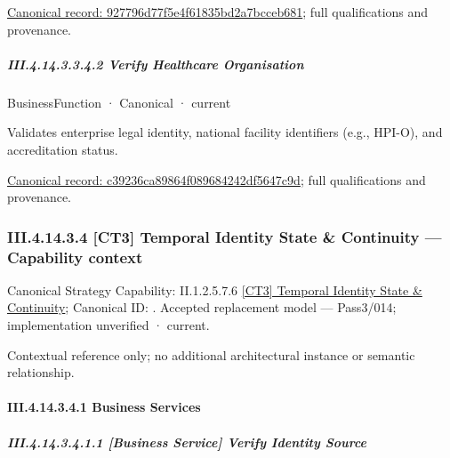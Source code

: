 {\footnotesize \href{../../../../continuum/business/business-function/927796d77f5e4f61835bd2a7bcceb681.md}{Canonical record: 927796d77f5e4f61835bd2a7bcceb681}; full qualifications and provenance.}\par
\subparagraph*{III.4.14.3.3.4.2 Verify Healthcare Organisation}
\label{navigation:III.4.14.3.3.4.2}

\label{element:c39236ca89864f089684242df5647c9d}
{\small BusinessFunction · Canonical · current}\par

Validates enterprise legal identity, national facility identifiers (e.g., HPI-O), and accreditation status.


{\footnotesize \href{../../../../continuum/business/business-function/c39236ca89864f089684242df5647c9d.md}{Canonical record: c39236ca89864f089684242df5647c9d}; full qualifications and provenance.}\par
\subsubsection*{III.4.14.3.4 [CT3] Temporal Identity State \& Continuity — Capability context}
\label{navigation:III.4.14.3.4}

{\small Canonical Strategy Capability: II.1.2.5.7.6 \hyperref[element:dae537d7b2f94d1596036ba891cab10d]{[CT3] Temporal Identity State \& Continuity}; Canonical ID: \texttt{}. Accepted replacement model — Pass3/014; implementation unverified · current.}\par
Contextual reference only; no additional architectural instance or semantic relationship.\par
\paragraph*{III.4.14.3.4.1 Business Services}
\label{navigation:III.4.14.3.4.1}

\subparagraph*{III.4.14.3.4.1.1 [Business Service] Verify Identity Source}
\label{navigation:III.4.14.3.4.1.1}

